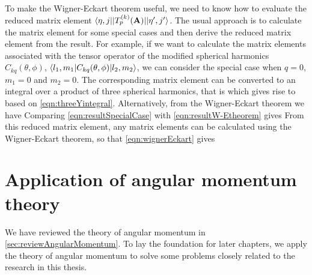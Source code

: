 To make the Wigner-Eckart theorem useful, we need to know how to evaluate the reduced matrix element 
$\langle \eta, j | |T_p^{(k)}(\mathbf{A})|  | \eta^{\prime}, j^{\prime} \rangle$. The usual approach is to calculate the 
matrix element for some special cases and then derive the reduced matrix element from the result. For example,
if we want to calculate the matrix elements associated with the tensor operator of the modified spherical harmonics 
$C_{kq}(\theta, \phi)$, $\langle  l_1, m_1 | C_{kq}(\theta, \phi)  |  l_2, m_2 \rangle$, 
we can consider the special case when $q=0$, $m_1 =0$ and $m_2 =0$. The corresponding matrix element can be converted to an integral over a product of three spherical harmonics, that is
which gives rise to 
based on \autoref{eqn:threeYintegral}. 
Alternatively, from the Wigner-Eckart theorem we have
Comparing \autoref{eqn:resultSpecialCase} with \autoref{eqn:resultW-Etheorem} gives
From this reduced matrix element, any matrix elements can be calculated using the Wigner-Eckart theorem, so that
\autoref{eqn:wignerEckart} gives


\section{Application of angular momentum theory}
\label{sec:applicationAMT}

We have reviewed the theory of angular momentum in \autoref{sec:reviewAngularMomentum}. To  lay the foundation for later chapters, we apply the theory of angular momentum to solve some
problems closely related to the research in this thesis. 

